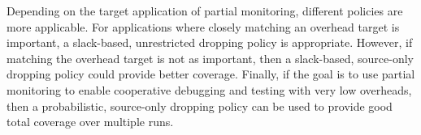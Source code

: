 Depending on the target application of partial monitoring, different policies
are more applicable.
For applications where closely matching an overhead target is important, a
slack-based, unrestricted dropping policy is appropriate. However, if matching
the overhead target is not as important, then a slack-based, source-only dropping
policy could provide better coverage. 
Finally, if the goal is to use partial monitoring to enable cooperative
debugging and testing with very low overheads, then a probabilistic,
source-only dropping policy can be used to provide good total coverage over
multiple runs.

% 
